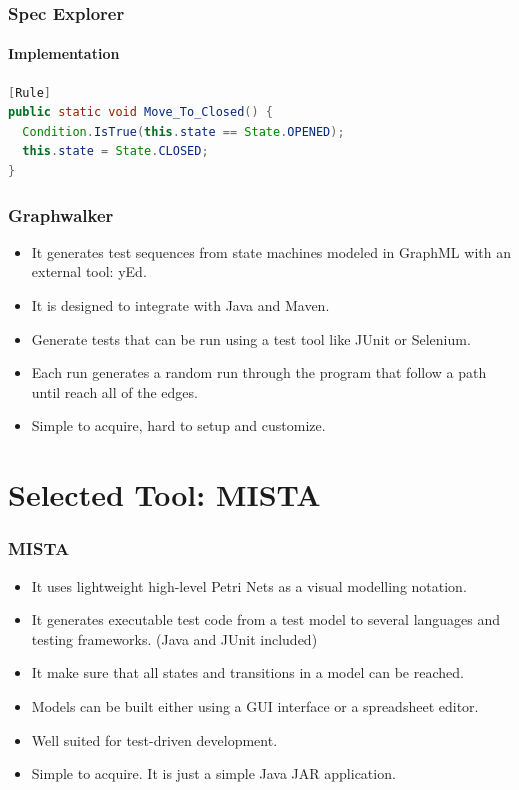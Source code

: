 \documentclass[notes]{beamer}
\begin{document}
\begin{frame}[fragile]
\frametitle{Spec Explorer}
\framesubtitle{Implementation}
\begin{lstlisting}[language=Java,basicstyle=\ttfamily,keywordstyle=\color{red},caption={Snippet that represents a transition/event of the model. It must use the \texttt{Rule} attribute. Guards are implemented in the same method.}, captionpos=b]
[Rule]
public static void Move_To_Closed() {
  Condition.IsTrue(this.state == State.OPENED);
  this.state = State.CLOSED;
}
\end{lstlisting}
\end{frame}

\begin{frame}
    \frametitle{Graphwalker}
    \begin{itemize}[<+->]
        \item It generates test sequences from state machines modeled in GraphML with an external tool: yEd.
        \item It is designed to integrate with Java and Maven.
        \item Generate tests that can be run using a test tool like JUnit or Selenium.
        \item Each run generates a random run through the program that follow a path until reach all of the edges.
        \item Simple to acquire, hard to setup and customize.
    \end{itemize}
\end{frame}

\section{Selected Tool: MISTA}

\begin{frame}
  \frametitle{MISTA}
    \begin{itemize}[<+->]
    \item It uses lightweight high-level Petri Nets as a visual modelling notation.
    \item It generates executable test code from a test model to several languages and testing frameworks. (Java and JUnit included)
    \item It make sure that all states and transitions in a model can be reached.
    \item Models can be built either using a GUI interface or a spreadsheet editor.
    \item Well suited for test-driven development.
    \item Simple to acquire. It is just a simple Java JAR application.
  \end{itemize}
\end{frame}
\end{document}
